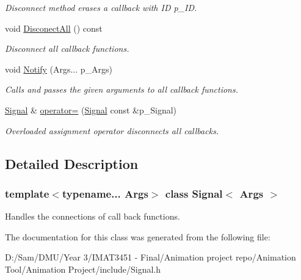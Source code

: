 \begin{DoxyCompactItemize}
\begin{DoxyCompactList}\small\item\em Disconnect method erases a callback with ID p\+\_\+\+ID. \end{DoxyCompactList}\item 
\mbox{\label{class_signal_a84a53c35c242b67e1e6fbb3d1545eed8}} 
void \hyperlink{class_signal_a84a53c35c242b67e1e6fbb3d1545eed8}{Disconect\+All} () const
\begin{DoxyCompactList}\small\item\em Disconnect all callback functions. \end{DoxyCompactList}\item 
\mbox{\label{class_signal_a3e5a119b3f1946bdd722518039d4f36d}} 
void \hyperlink{class_signal_a3e5a119b3f1946bdd722518039d4f36d}{Notify} (Args... p\+\_\+\+Args)
\begin{DoxyCompactList}\small\item\em Calls and passes the given arguments to all callback functions. \end{DoxyCompactList}\item 
\mbox{\label{class_signal_ae06f307f87638c3d59a8453bf9031fec}} 
\hyperlink{class_signal}{Signal} \& \hyperlink{class_signal_ae06f307f87638c3d59a8453bf9031fec}{operator=} (\hyperlink{class_signal}{Signal} const \&p\+\_\+\+Signal)
\begin{DoxyCompactList}\small\item\em Overloaded assignment operator disconnects all callbacks. \end{DoxyCompactList}\end{DoxyCompactItemize}


\subsection{Detailed Description}
\subsubsection*{template$<$typename... Args$>$\newline
class Signal$<$ Args $>$}

Handles the connections of call back functions. 

The documentation for this class was generated from the following file\+:\begin{DoxyCompactItemize}
\item 
D\+:/\+Sam/\+D\+M\+U/\+Year 3/\+I\+M\+A\+T3451 -\/ Final/\+Animation project repo/\+Animation Tool/\+Animation Project/include/Signal.\+h\end{DoxyCompactItemize}
